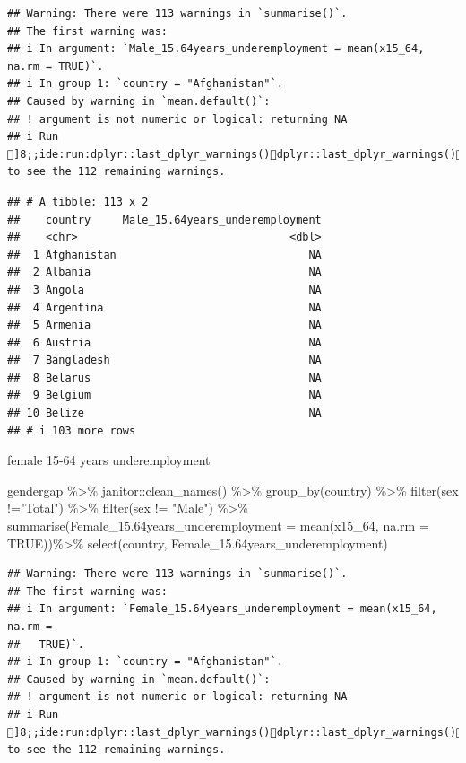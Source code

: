 \documentclass[
]{article}
\newenvironment{Shaded}{\begin{snugshade}}{\end{snugshade}}
\newcommand{\AttributeTok}[1]{\textcolor[rgb]{0.77,0.63,0.00}{#1}}
\newcommand{\ConstantTok}[1]{\textcolor[rgb]{0.00,0.00,0.00}{#1}}
\newcommand{\FloatTok}[1]{\textcolor[rgb]{0.00,0.00,0.81}{#1}}
\newcommand{\FunctionTok}[1]{\textcolor[rgb]{0.00,0.00,0.00}{#1}}
\newcommand{\NormalTok}[1]{#1}
\newcommand{\SpecialCharTok}[1]{\textcolor[rgb]{0.00,0.00,0.00}{#1}}
\newcommand{\StringTok}[1]{\textcolor[rgb]{0.31,0.60,0.02}{#1}}
\begin{document}
\begin{verbatim}
## Warning: There were 113 warnings in `summarise()`.
## The first warning was:
## i In argument: `Male_15.64years_underemployment = mean(x15_64, na.rm = TRUE)`.
## i In group 1: `country = "Afghanistan"`.
## Caused by warning in `mean.default()`:
## ! argument is not numeric or logical: returning NA
## i Run ]8;;ide:run:dplyr::last_dplyr_warnings()dplyr::last_dplyr_warnings()]8;; to see the 112 remaining warnings.
\end{verbatim}

\begin{verbatim}
## # A tibble: 113 x 2
##    country     Male_15.64years_underemployment
##    <chr>                                 <dbl>
##  1 Afghanistan                              NA
##  2 Albania                                  NA
##  3 Angola                                   NA
##  4 Argentina                                NA
##  5 Armenia                                  NA
##  6 Austria                                  NA
##  7 Bangladesh                               NA
##  8 Belarus                                  NA
##  9 Belgium                                  NA
## 10 Belize                                   NA
## # i 103 more rows
\end{verbatim}

female 15-64 years underemployment

\begin{Shaded}
\begin{Highlighting}[]
\NormalTok{gendergap }\SpecialCharTok{\%\textgreater{}\%}
\NormalTok{  janitor}\SpecialCharTok{::}\FunctionTok{clean\_names}\NormalTok{() }\SpecialCharTok{\%\textgreater{}\%}
  \FunctionTok{group\_by}\NormalTok{(country) }\SpecialCharTok{\%\textgreater{}\%}
  \FunctionTok{filter}\NormalTok{(sex }\SpecialCharTok{!=}\StringTok{"Total"}\NormalTok{) }\SpecialCharTok{\%\textgreater{}\%}
  \FunctionTok{filter}\NormalTok{(sex }\SpecialCharTok{!=} \StringTok{"Male"}\NormalTok{) }\SpecialCharTok{\%\textgreater{}\%}
  \FunctionTok{summarise}\NormalTok{(}\AttributeTok{Female\_15.64years\_underemployment =} \FunctionTok{mean}\NormalTok{(x15\_64, }\AttributeTok{na.rm =} \ConstantTok{TRUE}\NormalTok{))}\SpecialCharTok{\%\textgreater{}\%}
  \FunctionTok{select}\NormalTok{(country, Female\_15}\FloatTok{.64}\NormalTok{years\_underemployment)}
\end{Highlighting}
\end{Shaded}

\begin{verbatim}
## Warning: There were 113 warnings in `summarise()`.
## The first warning was:
## i In argument: `Female_15.64years_underemployment = mean(x15_64, na.rm =
##   TRUE)`.
## i In group 1: `country = "Afghanistan"`.
## Caused by warning in `mean.default()`:
## ! argument is not numeric or logical: returning NA
## i Run ]8;;ide:run:dplyr::last_dplyr_warnings()dplyr::last_dplyr_warnings()]8;; to see the 112 remaining warnings.
\end{verbatim}
\end{document}
